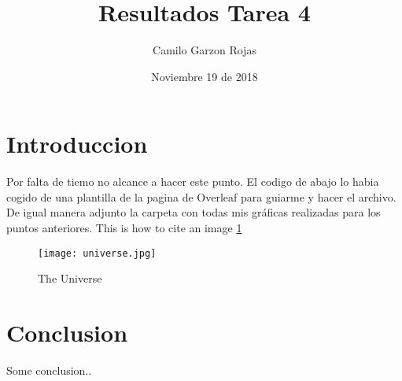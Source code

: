 \documentclass{article}
\title{Resultados Tarea 4}
\author{Camilo Garzon Rojas}
\date{Noviembre 19 de 2018}
\begin{document}
\maketitle

\section{Introduccion}
Por falta de tiemo no alcance a hacer este punto. El codigo de abajo lo habia cogido de una plantilla de la pagina de Overleaf para guiarme y hacer el archivo. De igual manera adjunto la carpeta con todas mis gráficas realizadas para los puntos anteriores.
This is how to cite an image \ref{fig:universe}

\begin{figure}[h!]
\centering
\texttt{[image: universe.jpg]}
\caption{The Universe}
\label{fig:universe}
\end{figure}

\section{Conclusion}
Some conclusion..
\end{document}
